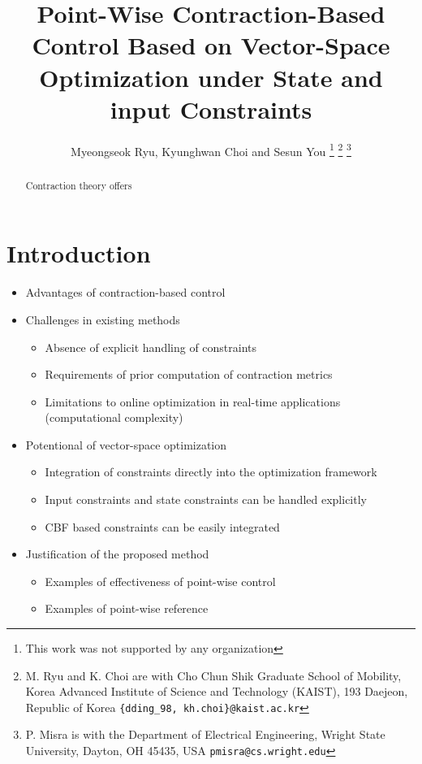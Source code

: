 \documentclass[letterpaper, 10 pt, conference]{ieeeconf}
\title{\LARGE \bf
    Point-Wise Contraction-Based Control Based on Vector-Space Optimization under State and input Constraints
}
\author{
    Myeongseok Ryu, Kyunghwan Choi and Sesun You
    \thanks{This work was not supported by any organization}%
    \thanks{M. Ryu and K. Choi are with Cho Chun Shik Graduate School of Mobility, Korea Advanced Institute of Science and Technology (KAIST), 193 Daejeon, Republic of Korea
    {\tt\small \{dding\_98, kh.choi\}@kaist.ac.kr}}%
    \thanks{P. Misra is with the Department of Electrical Engineering, Wright State University,
    Dayton, OH 45435, USA
    {\tt\small pmisra@cs.wright.edu}}%
}
\begin{document}
\maketitle
\thispagestyle{empty}
\pagestyle{empty}


\begin{abstract}
    Contraction theory offers 


\end{abstract}


\section{Introduction}

\begin{itemize}
    \item Advantages of contraction-based control
    \item Challenges in existing methods
    \begin{itemize}
        \item Absence of explicit handling of constraints
        \item Requirements of prior computation of contraction metrics
        \item Limitations to online optimization in real-time applications (computational complexity)
    \end{itemize}
    \item Potentional of vector-space optimization
    \begin{itemize}
        \item Integration of constraints directly into the optimization framework
        \item Input constraints and state constraints can be handled explicitly
        \item CBF based constraints can be easily integrated
    \end{itemize}
    \item Justification of the proposed method
    \begin{itemize}
        \item Examples of effectiveness of point-wise control
        \item Examples of point-wise reference
    \end{itemize}
\end{itemize}
\end{document}
